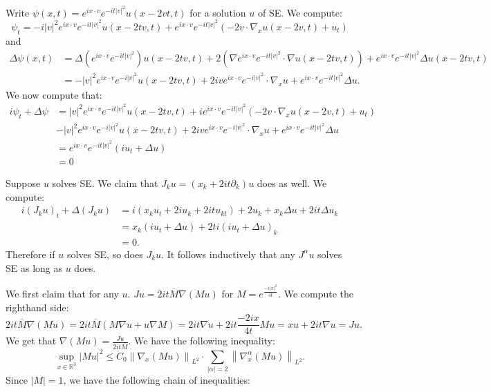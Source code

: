 \documentclass[12pt, a4paper]{article}
\theoremstyle{definition}
\newcommand{\R}{\mathbb{R}}                           %
\newcommand{\grad}{\nabla}
\newcommand{\ol}{\overline}
\newcommand{\norm}[1]{\left\lVert#1\right\rVert}
\begin{document}
\item Write $\psi(x,t) = e^{i x \cdot v} e^{-i t|v|^2} u(x-2vt, t)$ for a solution $u$ of SE. 
	We compute: 
$$ \psi_t = -i |v|^2 e^{i x \cdot v} e^{-it |v|^2} u(x-2tv, t) + e^{ix \cdot v} e^{-i t|v|^2} \left( -2 v \cdot \grad_x u(x-2v, t) + u_t \right) $$ 
and 
\begin{align*}
	\Delta \psi(x,t) & = 	\Delta \left( e^{i x \cdot v} e^{-it|v|^2}  \right) u(x-2tv,t) + 2 \left( \grad e^{i x \cdot v} e^{-i t|v|^2} \cdot \grad{u(x-2tv, t)} \right)+ e^{i x \cdot v} e^{-i t|v|^2} \Delta u(x-2tv, t)
	\\ & = -|v|^2 e^{ix \cdot v} e^{-i|v|^2} u(x-2tv, t) + 2iv e^{i x\cdot v} e^{-i|v|^2} \cdot \grad_x u  + e^{ix \cdot v} e^{-it|v|^2} \Delta u.
\end{align*}
We now compute that:
\begin{align*}
	i \psi_t + \Delta \psi & =  |v|^2 e^{i x \cdot v} e^{-it |v|^2} u(x-2tv, t) + ie^{ix \cdot v} e^{-i t|v|^2} \left( -2 v \cdot \grad_x u(x-2v, t) + u_t \right)
	\\ &  -|v|^2 e^{ix \cdot v} e^{-i|v|^2} u(x-2tv, t) + 2iv e^{i x\cdot v} e^{-i|v|^2} \cdot \grad_x u  + e^{ix \cdot v} e^{-it|v|^2} \Delta u
	\\ & = e^{i x \cdot v} e^{-i t|v|^2} \left( iu_t + \Delta u \right)
	\\ & = 0
\end{align*}
\item Suppose $u$ solves SE. We claim that $J_ku = \left( x_k + 2it \partial_k \right)u$ does as well.  We compute: 
\begin{align*}
	i (J_k u)_t + \Delta (J_k u) & = i (x_k u_t + 2i u_k + 2it u_{kt}) + 2u_k +x_k \Delta u+ 2it \Delta u_k
	\\ & = x_k (i u_t + \Delta u) + 2ti (iu_t +\Delta u)_k
	\\ & = 0.
\end{align*}
Therefore if $u$ solves SE, so does $J_k u$. It follows inductively that any $J^\alpha u$ solves SE as long as $u$ does. 
\item We first claim that for any $u$. $Ju = 2it \ol{M} \grad(Mu)$ for $M = e^{ \frac{ -i|x|^2 }{ 4t }	}$. We compute the righthand side:
	$$ 2it\ol{M} \grad(Mu) = 2it \ol{M}\left( M \grad u + u \grad M \right)  =2it \grad u + 2it \frac{ -2ix }{ 4t }M u = xu + 2it \grad u = Ju. $$ 
We get that $\grad (Mu) = \frac{ Ju }{ 2it \ol{M} }$. 
We have the following inequality: 
$$ \sup_{x\in \R^3} |Mu|^2 \leq C_0 \norm{\grad_x (Mu)}_{L^2} \cdot \sum_{|\alpha | = 2} \norm{\grad_x^\alpha( Mu)}_{L^2}. $$ Since $|M| = 1$, we have the following chain of inequalities:
\end{document}
